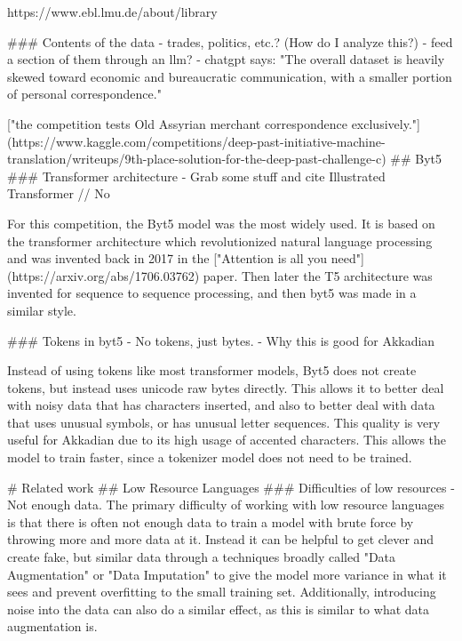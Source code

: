 https://www.ebl.lmu.de/about/library

### Contents of the data
- trades, politics, etc.? (How do I analyze this?)
    - feed a section of them through an llm?
    - chatgpt says: "The overall dataset is heavily skewed toward economic and bureaucratic communication, with a smaller portion of personal correspondence."

    ["the competition tests Old Assyrian merchant correspondence exclusively."](https://www.kaggle.com/competitions/deep-past-initiative-machine-translation/writeups/9th-place-solution-for-the-deep-past-challenge-c)
## Byt5
### Transformer architecture
- Grab some stuff and cite Illustrated Transformer // No

For this competition, the Byt5 model was the most widely used. It is based on the transformer architecture which revolutionized natural language processing and was invented back in 2017 in the ["Attention is all you need"](https://arxiv.org/abs/1706.03762) paper. Then later the T5 architecture was invented for sequence to sequence processing, and then byt5 was made in a similar style.

### Tokens in byt5
- No tokens, just bytes.
- Why this is good for Akkadian

Instead of using tokens like most transformer models, Byt5 does not create tokens, but instead uses unicode raw bytes directly. This allows it to better deal with noisy data that has characters inserted, and also to better deal with data that uses unusual symbols, or has unusual letter sequences. This quality is very useful for Akkadian due to its high usage of accented characters. This allows the model to train faster, since a tokenizer model does not need to be trained.

# Related work
## Low Resource Languages
### Difficulties of low resources
- Not enough data.
The primary difficulty of working with low resource languages is that there is often not enough data to train a model with brute force by throwing more and more data at it. Instead it can be helpful to get clever and create fake, but similar data through a techniques broadly called "Data Augmentation" or "Data Imputation" to give the model more variance in what it sees and prevent overfitting to the small training set. Additionally, introducing noise into the data can also do a similar effect, as this is similar to what data augmentation is.

